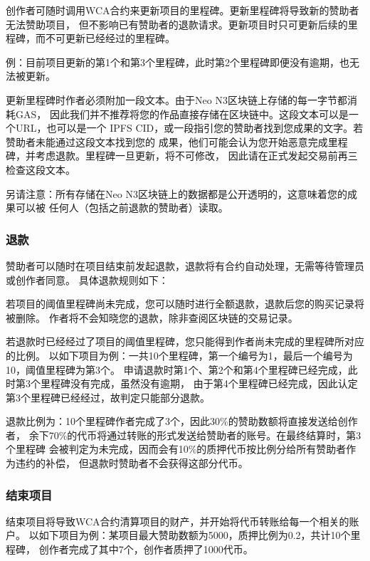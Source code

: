 \documentclass[11pt,UTF8,a4paper]{ctexart}
\begin{document}
    创作者可随时调用WCA合约来更新项目的里程碑。更新里程碑将导致新的赞助者无法赞助项目，
    但不影响已有赞助者的退款请求。更新项目时只可更新后续的里程碑，而不可更新已经经过的里程碑。

    例：目前项目更新的第1个和第3个里程碑，此时第2个里程碑即便没有逾期，也无法被更新。

    更新里程碑时作者必须附加一段文本。由于Neo N3区块链上存储的每一字节都消耗GAS，
    因此我们并不推荐将您的作品直接存储在区块链中。这段文本可以是一个URL，也可以是一个
    IPFS CID，或一段指引您的赞助者找到您成果的文字。若赞助者未能通过这段文本找到您的
    成果，他们可能会认为您开始恶意完成里程碑，并考虑退款。里程碑一旦更新，将不可修改，
    因此请在正式发起交易前再三检查这段文本。

    另请注意：所有存储在Neo N3区块链上的数据都是公开透明的，这意味着您的成果可以被
    任何人（包括之前退款的赞助者）读取。

    \subsubsection{退款}

    赞助者可以随时在项目结束前发起退款，退款将有合约自动处理，无需等待管理员或创作者同意。
    具体退款规则如下：

    若项目的阈值里程碑尚未完成，您可以随时进行全额退款，退款后您的购买记录将被删除。
    作者将不会知晓您的退款，除非查阅区块链的交易记录。

    若退款时已经经过了项目的阈值里程碑，您只能得到作者尚未完成的里程碑所对应的比例。
    以如下项目为例：一共10个里程碑，第一个编号为1，最后一个编号为10，阈值里程碑为第3个。
    申请退款时第1个、第2个和第4个里程碑已经完成，此时第3个里程碑没有完成，虽然没有逾期，
    由于第4个里程碑已经完成，因此认定第3个里程碑已经经过，故判定只能部分退款。

    退款比例为：10个里程碑作者完成了3个，因此30\%的赞助数额将直接发送给创作者，
    余下70\%的代币将通过转账的形式发送给赞助者的账号。在最终结算时，第3个里程碑
    会被判定为未完成，因而会有10\%的质押代币按比例分给所有赞助者作为违约的补偿，
    但退款时赞助者不会获得这部分代币。

    \subsubsection{结束项目}

    结束项目将导致WCA合约清算项目的财产，并开始将代币转账给每一个相关的账户。
    以如下项目为例：某项目最大赞助数额为5000，质押比例为0.2，共计10个里程碑，
    创作者完成了其中7个，创作者质押了1000代币。
\end{document}
